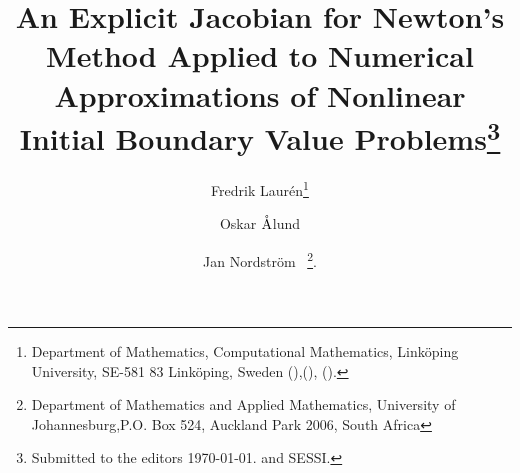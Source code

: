 

\usepackage{lipsum}
\usepackage{amsfonts}
\usepackage{graphicx}
\usepackage{epstopdf}
\usepackage{algorithmic}

\usepackage{cleveref}
\usepackage{bm}
\usepackage{mathrsfs}
\usepackage{placeins}
\usepackage{url} %
\usepackage[utf8]{inputenc}


\ifpdf
\else
\fi

\usepackage{enumitem}

\newcommand{\creflastconjunction}{, and~}




\title{An Explicit Jacobian for Newton's Method Applied to Numerical Approximations of Nonlinear Initial Boundary Value Problems\thanks{Submitted to the editors \today.
 and SESSI.}}

\author{Fredrik Laur\'en\thanks{Department of Mathematics, Computational Mathematics, Link\"oping University, SE-581 83 Link\"oping, Sweden 
(),(), ().}
\and Oskar $\rm \mathring{A}$lund \footnotemark[2]
\and Jan Nordstr\"om \footnotemark[2]\ \thanks{Department of Mathematics and Applied Mathematics, University of Johannesburg,P.O. Box 524, Auckland Park 2006, South Africa}.}

\usepackage{amsopn}
\DeclareMathOperator{\diag}{diag}


